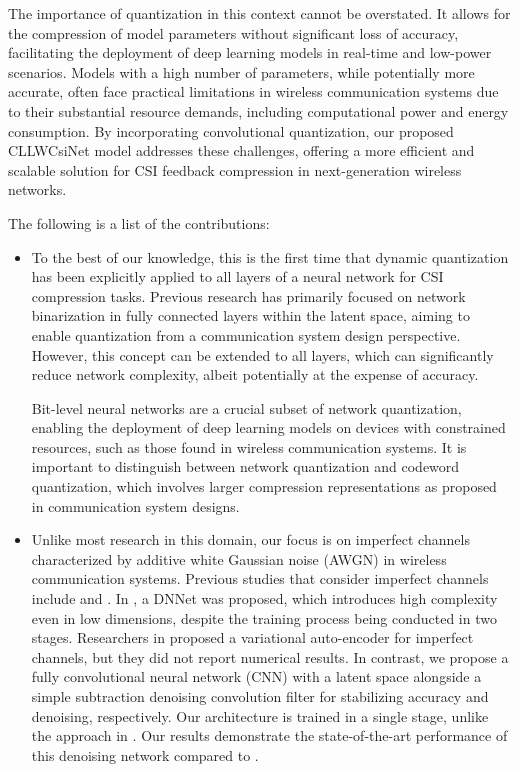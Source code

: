 \documentclass[lettersize,journal]{IEEEtran}
\begin{document}
The importance of quantization in this context cannot be overstated. It allows for the compression of model parameters without significant loss of accuracy, facilitating the deployment of deep learning models in real-time and low-power scenarios. Models with a high number of parameters, while potentially more accurate, often face practical limitations in wireless communication systems due to their substantial resource demands, including computational power and energy consumption. By incorporating convolutional quantization, our proposed CLLWCsiNet model addresses these challenges, offering a more efficient and scalable solution for CSI feedback compression in next-generation wireless networks.

The following is a list of the contributions:

\begin{itemize}
	\item To the best of our knowledge, this is the first time that dynamic quantization has been explicitly applied to all layers of a neural network for CSI compression tasks. Previous research has primarily focused on network binarization in fully connected layers within the latent space, aiming to enable quantization from a communication system design perspective. However, this concept can be extended to all layers, which can significantly reduce network complexity, albeit potentially at the expense of accuracy.
	
	Bit-level neural networks are a crucial subset of network quantization, enabling the deployment of deep learning models on devices with constrained resources, such as those found in wireless communication systems. It is important to distinguish between network quantization and codeword quantization, which involves larger compression representations as proposed in communication system designs.
	
	
	\item Unlike most research in this domain, our focus is on imperfect channels characterized by additive white Gaussian noise (AWGN) in wireless communication systems. Previous studies that consider imperfect channels include \cite{abw} and \cite{DBLP:journals/corr/abs-2011-04178}. In \cite{abw}, a DNNet was proposed, which introduces high complexity even in low dimensions, despite the training process being conducted in two stages. Researchers in \cite{DBLP:journals/corr/abs-2011-04178} proposed a variational auto-encoder for imperfect channels, but they did not report numerical results. In contrast, we propose a fully convolutional neural network (CNN) with a latent space alongside a simple subtraction denoising convolution filter for stabilizing accuracy and denoising, respectively. Our architecture is trained in a single stage, unlike the approach in \cite{abw}. Our results demonstrate the state-of-the-art performance of this denoising network compared to \cite{abw}.
	

\end{itemize}
\end{document}
